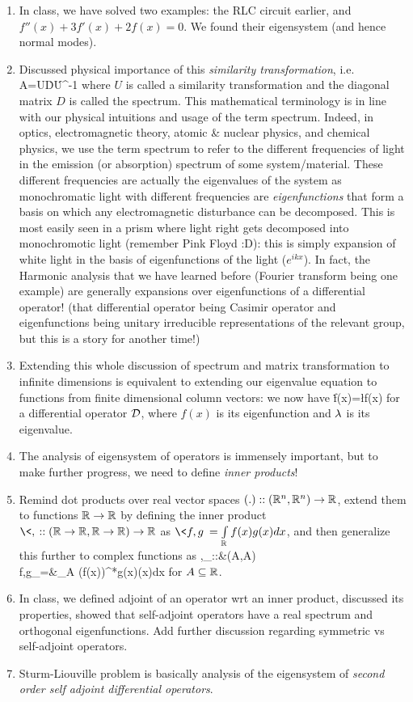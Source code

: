 {\begin{enumerate}
\item In class, we have solved two examples: the RLC circuit earlier, and $f''(x)+3f'(x)+2f(x)=0$. We found their eigensystem (and hence normal modes).
\item Discussed physical importance of this \emph{similarity transformation}, i.e. 
\be 
A=U\.D\.U^{-1}
\ee 
where $U$ is called a similarity transformation and the diagonal matrix $D$ is called the spectrum. This mathematical terminology is in line with our physical intuitions and usage of the term spectrum. Indeed, in optics, electromagnetic theory, atomic \& nuclear physics, and chemical physics, we use the term spectrum to refer to the different frequencies of light in the emission (or absorption) spectrum of  some system/material. These different frequencies are actually the eigenvalues of the system as monochromatic light with different frequencies are \emph{eigenfunctions} that form a basis on which any electromagnetic disturbance can be decomposed. This is most easily seen in a prism where light right gets decomposed into monochromotic light (remember Pink Floyd :D): this is simply expansion of white light in the basis of eigenfunctions of the light ($e^{ikx}$). In fact, the Harmonic analysis that we have learned before (Fourier transform being one example) are generally expansions over eigenfunctions of a differential operator! (that differential operator being Casimir operator and eigenfunctions being unitary irreducible representations of the relevant group, but this is a story for another time!)
\item Extending this whole discussion of spectrum and matrix transformation to infinite dimensions is equivalent to extending our eigenvalue equation to functions from finite dimensional column vectors: we now have
\be 
\cD\. f(x)=\l f(x)
\ee 
for a differential operator $\mathcal{D}$, where $f(x)$ is its eigenfunction and $\lambda$ is its eigenvalue.
\item The analysis of eigensystem of operators is immensely important, but to make further progress, we need to define \emph{inner products}!
\item Remind dot products over real vector spaces $(.)::(\mathbb{R}^n,\mathbb{R}^n)\to \mathbb{R}$, extend them to functions $\mathbb{R}\to\mathbb{R}$ by defining the inner product $\<,\>::(\R\to\R,\R\to\R)\to\R$ as $\<f,g\>=\int\limits_\R f(x)g(x)dx$, and then generalize this further to complex functions as 
\bea
\<,\>_\w::{}&{}(A\to\C,A\to\C)\to\C \\
\<f,g\>_\w={}&{}\int\limits_A \Big(f(x)\Big)^*g(x)\w(x)dx
\eea
for $A\subseteq\mathbb{R}$.
\item In class, we defined adjoint of an operator wrt an inner product, discussed its properties, showed that self-adjoint operators have a real spectrum and orthogonal eigenfunctions. Add further discussion regarding symmetric vs self-adjoint operators.
\item Sturm-Liouville problem is basically analysis of the eigensystem of \emph{second order self adjoint differential operators}.
\end{enumerate}
}

